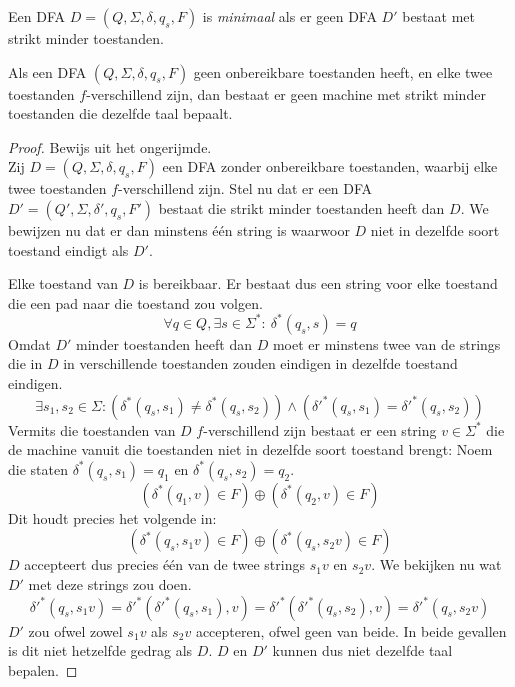 \documentclass[main.tex]{subfiles}
\begin{document}
\begin{de}
  Een DFA $D = (Q,\Sigma,\delta,q_{s},F)$ is \emph{minimaal} als er geen DFA $D'$ bestaat met strikt minder toestanden.
\end{de}

\begin{st}
  Als een DFA $(Q,\Sigma,\delta,q_{s},F)$ geen onbereikbare toestanden heeft, en elke twee toestanden $f$-verschillend zijn, dan bestaat er geen machine met strikt minder toestanden die dezelfde taal bepaalt.

  \begin{proof}
    Bewijs uit het ongerijmde.\\
    Zij $D = (Q,\Sigma,\delta,q_{s},F)$ een DFA zonder onbereikbare toestanden, waarbij elke twee toestanden $f$-verschillend zijn.
    Stel nu dat er een DFA $D' = (Q',\Sigma,\delta',q_{s},F')$ bestaat die strikt minder toestanden heeft dan $D$. We bewijzen nu dat er dan minstens \'e\'en string is waarwoor $D$ niet in dezelfde soort toestand eindigt als $D'$.
    
    Elke toestand van $D$ is bereikbaar.
    Er bestaat dus een string voor elke toestand die een pad naar die toestand zou volgen.
    \[ \forall q\in Q, \exists s\in \Sigma^{*}:\ \delta^{*}(q_{s},s) = q \]
    Omdat $D'$ minder toestanden heeft dan $D$ moet er minstens twee van de strings die in $D$ in verschillende toestanden zouden eindigen in dezelfde toestand eindigen.
    \[ \exists s_{1},s_{2} \in \Sigma: (\delta^{*}(q_{s},s_{1}) \neq \delta^{*}(q_{s},s_{2})) \wedge (\delta'^{*}(q_{s},s_{1}) = \delta'^{*}(q_{s},s_{2})) \]
    Vermits die toestanden van $D$ $f$-verschillend zijn bestaat er een string $v\in \Sigma^{*}$ die de machine vanuit die toestanden niet in dezelfde soort toestand brengt:
    Noem die staten $\delta^{*}(q_{s},s_{1}) = q_{1}$ en $\delta^{*}(q_{s},s_{2}) = q_{2}$.
    \[ (\delta^{*}(q_{1},v) \in F) \oplus (\delta^{*}(q_{2},v) \in F) \]
    Dit houdt precies het volgende in:
    \[ (\delta^{*}(q_{s},s_{1}v) \in F) \oplus (\delta^{*}(q_{s},s_{2}v) \in F) \]
    $D$ accepteert dus precies \'e\'en van de twee strings $s_{1}v$ en $s_{2}v$.
    We bekijken nu wat $D'$ met deze strings zou doen.
    \[ \delta'^{*}(q_{s},s_{1}v) = \delta'^{*}(\delta'^{*}(q_{s},s_{1}),v) = \delta'^{*}(\delta'^{*}(q_{s},s_{2}),v) = \delta'^{*}(q_{s},s_{2}v) \]
    $D'$ zou ofwel zowel $s_{1}v$ als $s_{2}v$ accepteren, ofwel geen van beide.
    In beide gevallen is dit niet hetzelfde gedrag als $D$.
    $D$ en $D'$ kunnen dus niet dezelfde taal bepalen.
  \end{proof}
\end{st}
\end{document}
